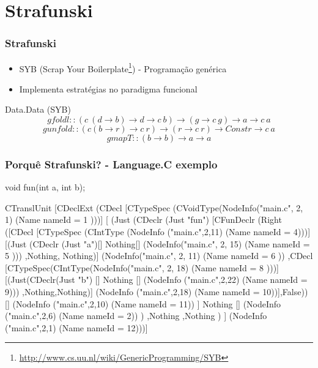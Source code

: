 \documentclass{beamer}
\begin{document}
\section{Strafunski}
\begin{frame}[fragile] \frametitle{Strafunski}
\begin{itemize}
\item SYB (Scrap Your Boilerplate\footnote{\url{http://www.cs.uu.nl/wiki/GenericProgramming/SYB}}) - Programação genérica
\item Implementa estratégias no paradigma funcional
\end{itemize}

\begin{block}{Data.Data (SYB)}
$$gfoldl :: (c~(d \rightarrow b) \rightarrow d \rightarrow c~b) \rightarrow (g \rightarrow c~g) \rightarrow a \rightarrow c~a$$
$$gunfold :: (c (b \rightarrow r) \rightarrow c~r) \rightarrow (r \rightarrow c~r) \rightarrow Constr \rightarrow c~a$$
$$gmapT :: (b \rightarrow b) \rightarrow a \rightarrow a$$
\end{block}
\end{frame}

\begin{frame}[fragile] \frametitle{Porquê Strafunski? - Language.C exemplo}
\begin{block}{void fun(int a, int b);}
\begin{haskell}
CTranslUnit 
[CDeclExt
(CDecl
[CTypeSpec (CVoidType(NodeInfo("main.c", 2, 1) (Name { nameId = 1 })))]
[ (Just
(CDeclr (Just "fun")
[CFunDeclr (Right
([CDecl [CTypeSpec (CIntType (NodeInfo ("main.c",2,11) (Name {nameId = 4})))]
[(Just (CDeclr (Just "a")[] Nothing[] (NodeInfo("main.c", 2, 15)
(Name { nameId = 5 })))
,Nothing, Nothing)] (NodeInfo("main.c", 2, 11) (Name { nameId = 6 }))
,CDecl [CTypeSpec(CIntType(NodeInfo("main.c", 2, 18) (Name { nameId = 8 })))]
[(Just(CDeclr(Just "b") [] Nothing [] (NodeInfo ("main.c",2,22)
(Name {nameId = 9})))
,Nothing,Nothing)]
(NodeInfo ("main.c",2,18) (Name {nameId = 10}))],False))
[] (NodeInfo ("main.c",2,10) (Name {nameId = 11}))
]
Nothing [] (NodeInfo ("main.c",2,6) (Name {nameId = 2}))
)
,Nothing
,Nothing
)
] (NodeInfo ("main.c",2,1) (Name {nameId = 12})))]
\end{haskell}
\end{block}
\end{frame}
\end{document}
